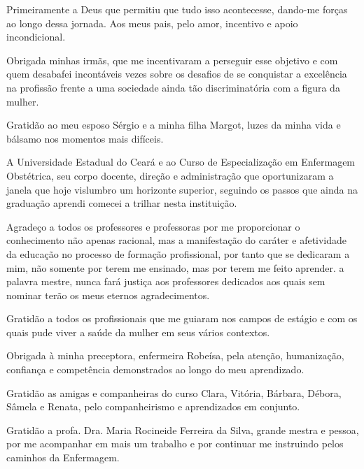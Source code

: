 Primeiramente a Deus que permitiu que tudo isso acontecesse, dando-me forças ao longo dessa jornada. 
Aos meus pais, pelo amor, incentivo e apoio incondicional.

Obrigada minhas irmãs, que me incentivaram a perseguir esse objetivo e com quem desabafei incontáveis vezes sobre os desafios de se conquistar a excelência na profissão frente a uma sociedade ainda tão discriminatória com a figura da mulher.

Gratidão ao meu esposo Sérgio e a minha filha Margot, luzes da minha vida e bálsamo nos momentos mais difíceis. 

A Universidade Estadual do Ceará e ao Curso de Especialização em Enfermagem Obstétrica, seu corpo docente, direção e administração que oportunizaram a janela que hoje vislumbro um horizonte superior, seguindo os passos que ainda na graduação aprendi comecei a trilhar nesta instituição.

Agradeço a todos os professores e professoras por me proporcionar o conhecimento não apenas racional, mas a manifestação do caráter e afetividade da educação no processo de formação profissional, por tanto que se dedicaram a mim, não somente por terem me ensinado, mas por terem me feito aprender. a palavra mestre, nunca fará justiça aos professores dedicados aos quais sem nominar terão os meus eternos agradecimentos. 

Gratidão a todos os profissionais que me guiaram nos campos de estágio e com os quais pude viver a saúde da mulher em seus vários contextos. 

Obrigada à minha preceptora, enfermeira Robeísa, pela atenção, humanização, confiança e competência demonstrados ao longo do meu aprendizado. 

Gratidão as amigas e companheiras do curso Clara, Vitória, Bárbara, Débora, Sâmela e Renata, pelo companheirismo e aprendizados em conjunto. 

Gratidão a profa. Dra. Maria Rocineide Ferreira da Silva, grande mestra e pessoa, por me acompanhar em mais um trabalho e por continuar me instruindo pelos caminhos da Enfermagem.
